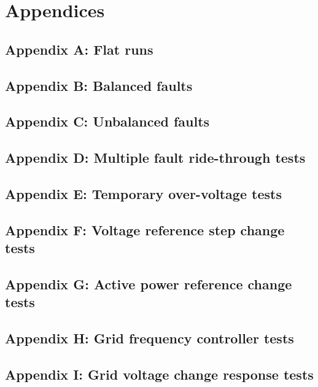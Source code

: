 \documentclass{../grid-link-report}
\newcommand{\projectassetsdir}{../project-assets}
\begin{document}
	
	
	
	
	\chapter{Appendices}
	\section{Appendix A: Flat runs}
	\label{Appendix A: Flat runs}
	\section{Appendix B: Balanced faults}
	\label{Appendix B: Balanced faults}
	\section{Appendix C: Unbalanced faults}
	\label{Appendix C: Unbalanced faults}
	\section{Appendix D: Multiple fault ride-through tests}
	\label{Appendix D: Multiple fault ride-through tests}
	\section{Appendix E: Temporary over-voltage tests}
	\label{Appendix E: Temporary over-voltage tests}
	\section{Appendix F: Voltage reference step change tests}
	\label{Appendix F: Voltage reference step change tests}
	\section{Appendix G: Active power reference change tests}
	\label{Appendix G: Active power reference change tests}
	\section{Appendix H: Grid frequency controller tests}
	\label{Appendix H: Grid frequency controller tests}
	\section{Appendix I: Grid voltage change response tests}
	\label{Appendix I: Grid voltage change response tests}
\end{document}
